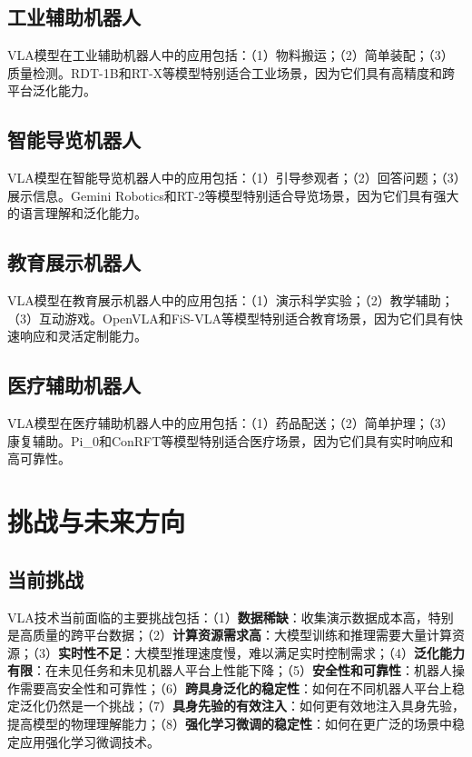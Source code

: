 \documentclass[12pt,a4paper]{article}
\begin{document}
\subsection{工业辅助机器人}

VLA模型在工业辅助机器人中的应用包括：（1）物料搬运；（2）简单装配；（3）质量检测。RDT-1B和RT-X等模型特别适合工业场景，因为它们具有高精度和跨平台泛化能力。

\subsection{智能导览机器人}

VLA模型在智能导览机器人中的应用包括：（1）引导参观者；（2）回答问题；（3）展示信息。Gemini Robotics和RT-2等模型特别适合导览场景，因为它们具有强大的语言理解和泛化能力。

\subsection{教育展示机器人}

VLA模型在教育展示机器人中的应用包括：（1）演示科学实验；（2）教学辅助；（3）互动游戏。OpenVLA和FiS-VLA等模型特别适合教育场景，因为它们具有快速响应和灵活定制能力。

\subsection{医疗辅助机器人}

VLA模型在医疗辅助机器人中的应用包括：（1）药品配送；（2）简单护理；（3）康复辅助。Pi\_0和ConRFT等模型特别适合医疗场景，因为它们具有实时响应和高可靠性。

\section{挑战与未来方向}

\subsection{当前挑战}

VLA技术当前面临的主要挑战包括：（1）\textbf{数据稀缺}：收集演示数据成本高，特别是高质量的跨平台数据；（2）\textbf{计算资源需求高}：大模型训练和推理需要大量计算资源；（3）\textbf{实时性不足}：大模型推理速度慢，难以满足实时控制需求；（4）\textbf{泛化能力有限}：在未见任务和未见机器人平台上性能下降；（5）\textbf{安全性和可靠性}：机器人操作需要高安全性和可靠性；（6）\textbf{跨具身泛化的稳定性}：如何在不同机器人平台上稳定泛化仍然是一个挑战；（7）\textbf{具身先验的有效注入}：如何更有效地注入具身先验，提高模型的物理理解能力；（8）\textbf{强化学习微调的稳定性}：如何在更广泛的场景中稳定应用强化学习微调技术。
\end{document}
